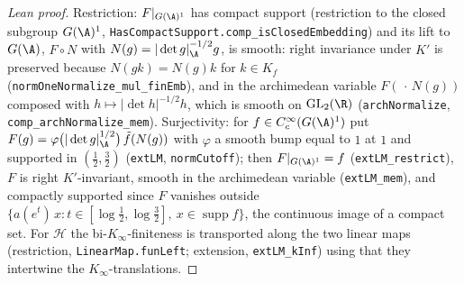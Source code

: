 \begin{proof}[Lean proof]
Restriction: $F|_{G(\A)^1}$ has compact support (restriction to the closed subgroup $G(\A)^1$, \texttt{HasCompactSupport.comp\_isClosedEmbedding}) and its lift to $G(\A)$, $F\circ N$ with $N(g)=|\det g|_\A^{-1/2}g$, is smooth: right invariance under $K'$ is preserved because $N(gk)=N(g)k$ for $k\in K_f$ (\texttt{normOneNormalize\_mul\_finEmb}), and in the archimedean variable $F(\,\cdot\,N(g))$ composed with $h\mapsto|\det h|^{-1/2}h$, which is smooth on $\mathrm{GL}_2(\R)$ (\texttt{archNormalize}, \texttt{comp\_archNormalize\_mem}). Surjectivity: for $f\in C_c^\infty(G(\A)^1)$ put $F(g)=\varphi\bigl(|\det g|_\A^{1/2}\bigr)\,\tilde f(N(g))$ with $\varphi$ a smooth bump equal to $1$ at $1$ and supported in $(\tfrac12,\tfrac32)$ (\texttt{extLM}, \texttt{normCutoff}); then $F|_{G(\A)^1}=f$ (\texttt{extLM\_restrict}), $F$ is right $K'$-invariant, smooth in the archimedean variable (\texttt{extLM\_mem}), and compactly supported since $F$ vanishes outside $\{a(e^t)\,x:t\in[\log\tfrac12,\log\tfrac32],\ x\in\operatorname{supp}f\}$, the continuous image of a compact set. For $\mathcal H$ the bi-$K_\infty$-finiteness is transported along the two linear maps (restriction, \texttt{LinearMap.funLeft}; extension, \texttt{extLM\_kInf}) using that they intertwine the $K_\infty$-translations.
\end{proof}

